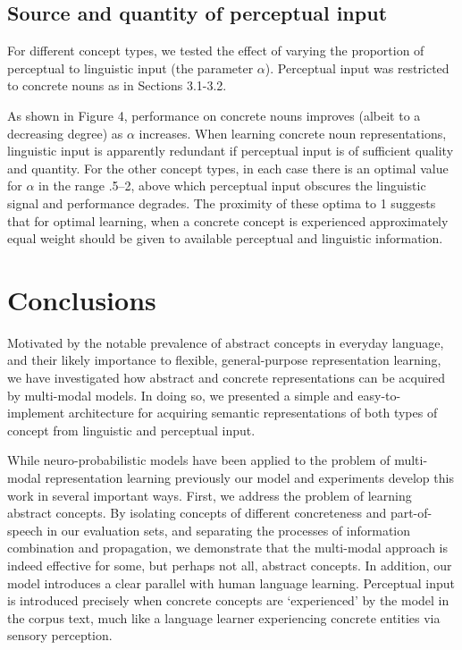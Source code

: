 \documentclass[11pt]{article}
\begin{document}
\subsection{Source and quantity of perceptual input} For different concept types, we tested the effect of varying the proportion of perceptual to linguistic input (the parameter \(\alpha\)). Perceptual input was restricted to concrete nouns as in Sections 3.1-3.2. 

As shown in Figure 4, performance on concrete nouns improves (albeit to a decreasing degree) as \( \alpha \) increases. When learning concrete noun representations, linguistic input is apparently redundant if perceptual input is of sufficient quality and quantity. For the other concept types, in each case there is an optimal value for \( \alpha \) in the range .5--2, above which perceptual input obscures the linguistic signal and performance degrades. The proximity of these optima to 1 suggests that  for optimal learning, when a concrete concept is experienced approximately equal weight should be given to available perceptual and linguistic information. 

\section{Conclusions}

Motivated by the notable prevalence of abstract concepts in everyday language, and their likely importance to flexible, general-purpose representation learning, we have investigated how abstract and concrete representations can be acquired by multi-modal models. In doing so, we presented a simple and easy-to-implement architecture for acquiring semantic representations of both types of concept from linguistic and perceptual input. 

While neuro-probabilistic models have been applied to the problem of multi-modal representation learning previously \cite{srivastava2012multimodal,wu2013online} our model and experiments develop this work in several important ways. First, we address the problem of learning abstract concepts. By isolating concepts of different concreteness and part-of-speech in our evaluation sets, and separating the processes of information combination and propagation, we demonstrate that the multi-modal approach is indeed effective for some, but perhaps not all, abstract concepts. In addition, our model introduces a clear parallel with human language learning. Perceptual input is introduced precisely when concrete concepts are `experienced' by the model in the corpus text, much like a language learner experiencing concrete entities via sensory perception.  
\end{document}
